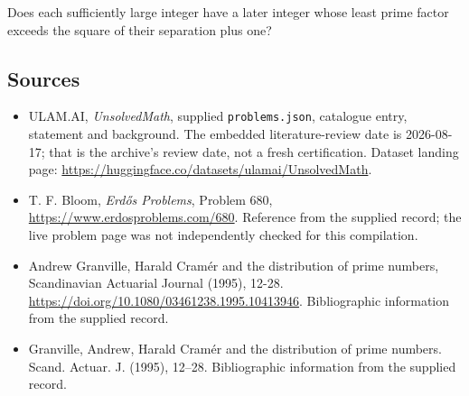 \documentclass[11pt,a4paper]{article}
\begin{document}
Does each sufficiently large integer have a later integer whose least prime factor exceeds the square of their separation plus one?

\subsection{Sources}

{\small

\begin{itemize}

\item[\hypertarget{source:statement:1}{S1}] ULAM.AI, \emph{UnsolvedMath}, supplied \texttt{problems.json}, catalogue entry, statement and background. The embedded literature-review date is 2026-08-17; that is the archive’s review date, not a fresh certification. Dataset landing page: \url{https://huggingface.co/datasets/ulamai/UnsolvedMath}.

\item[\hypertarget{source:statement:2}{S2}] T. F. Bloom, \emph{Erdős Problems}, Problem 680, \url{https://www.erdosproblems.com/680}. Reference from the supplied record; the live problem page was not independently checked for this compilation.

\item[\hypertarget{source:statement:3}{S3}] Andrew Granville, Harald Cramér and the distribution of prime numbers, Scandinavian Actuarial Journal (1995), 12-28. \url{https://doi.org/10.1080/03461238.1995.10413946}. Bibliographic information from the supplied record.

\item[\hypertarget{source:statement:4}{S4}] Granville, Andrew, Harald {C}ram\'{e}r and the distribution of prime numbers. Scand. Actuar. J. (1995), 12--28. Bibliographic information from the supplied record.

\end{itemize}

}

\label{end:statement}
\end{document}
